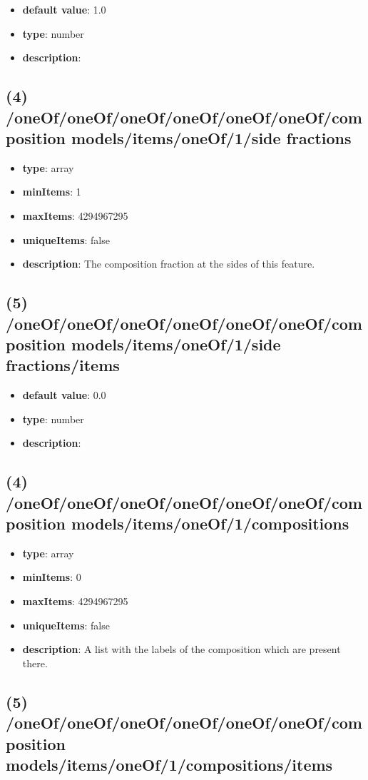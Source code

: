 \begin{itemize}[leftmargin=5em]\item {\bf default value}: 1.0
\item {\bf type}: number
\item {\bf description}: 
\end{itemize}\subsection{(4) /oneOf/oneOf/oneOf/oneOf/oneOf/oneOf/composition models/items/oneOf/1/side fractions}
\begin{itemize}[leftmargin=4em]\item {\bf type}: array
\item {\bf minItems}: 1
\item {\bf maxItems}: 4294967295
\item {\bf uniqueItems}: false
\item {\bf description}: The composition fraction at the sides of this feature.
\end{itemize}\subsection{(5) /oneOf/oneOf/oneOf/oneOf/oneOf/oneOf/composition models/items/oneOf/1/side fractions/items}
\begin{itemize}[leftmargin=5em]\item {\bf default value}: 0.0
\item {\bf type}: number
\item {\bf description}: 
\end{itemize}\subsection{(4) /oneOf/oneOf/oneOf/oneOf/oneOf/oneOf/composition models/items/oneOf/1/compositions}
\begin{itemize}[leftmargin=4em]\item {\bf type}: array
\item {\bf minItems}: 0
\item {\bf maxItems}: 4294967295
\item {\bf uniqueItems}: false
\item {\bf description}: A list with the labels of the composition which are present there.
\end{itemize}\subsection{(5) /oneOf/oneOf/oneOf/oneOf/oneOf/oneOf/composition models/items/oneOf/1/compositions/items}
